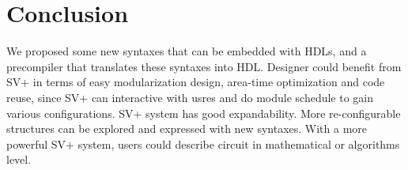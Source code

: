 \section{Conclusion}\label{sec:conclusion}
We proposed some new syntaxes that can be embedded with HDLs, and a precompiler that translates these syntaxes into HDL. Designer could benefit from SV+ in terms of easy modularization design, area-time optimization and code reuse, since SV+ can interactive with usres and do module schedule to gain various configurations. SV+ system has good expandability. More re-configurable structures can be explored and expressed with new syntaxes.
With a more powerful SV+ system, users could describe circuit in mathematical or algorithms level.  